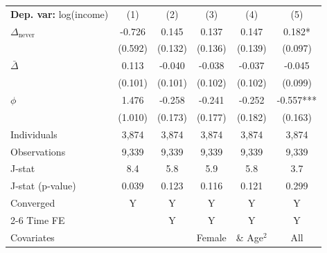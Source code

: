 \begin{tabular}{l ccccc} \toprule  \textbf{Dep. var:}  log(income) 
                    &\multicolumn{1}{c}{(1)}   &\multicolumn{1}{c}{(2)}   &\multicolumn{1}{c}{(3)}   &\multicolumn{1}{c}{(4)}   &\multicolumn{1}{c}{(5)}   \\

\addlinespace
$\Delta_{\text{never}}$&      -0.726   &       0.145   &       0.137   &       0.147   &       0.182*  \\
                    &     (0.592)   &     (0.132)   &     (0.136)   &     (0.139)   &     (0.097)   \\

\addlinespace
$\bar{\Delta}$      &       0.113   &      -0.040   &      -0.038   &      -0.037   &      -0.045   \\
                    &     (0.101)   &     (0.101)   &     (0.102)   &     (0.102)   &     (0.099)   \\

\addlinespace
$\phi$              &       1.476   &      -0.258   &      -0.241   &      -0.252   &      -0.557***\\
                    &     (1.010)   &     (0.173)   &     (0.177)   &     (0.182)   &     (0.163)   \\
\addlinespace
Individuals         &       3,874   &       3,874   &       3,874   &       3,874   &       3,874   \\
Observations        &       9,339   &       9,339   &       9,339   &       9,339   &       9,339   \\
J-stat              &         8.4   &         5.8   &         5.9   &         5.8   &         3.7   \\
J-stat (p-value)    &       0.039   &       0.123   &       0.116   &       0.121   &       0.299   \\
Converged           &           Y   &           Y   &           Y   &           Y   &           Y   \\
\cmidrule{2-6} Time FE & & Y & Y & Y & Y \\ Covariates & & & Female & \& Age$^2$ & All \\ \bottomrule \end{tabular}
